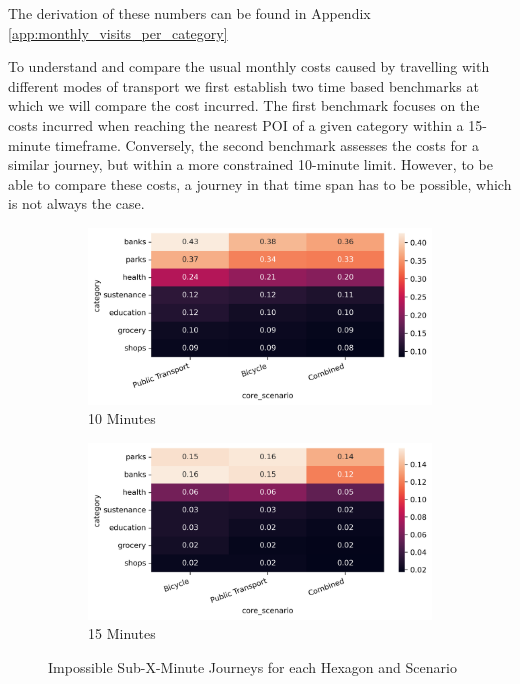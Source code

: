 The derivation of these numbers can be found in Appendix \ref{app:monthly_visits_per_category}

To understand and compare the usual monthly costs caused by travelling with different modes of transport we first establish two time based benchmarks at which we will compare the cost incurred.
The first benchmark focuses on the costs incurred when reaching the nearest POI of a given category within a 15-minute timeframe. 
Conversely, the second benchmark assesses the costs for a similar journey, but within a more constrained 10-minute limit.
However, to be able to compare these costs, a journey in that time span has to be possible, which is not always the case.


\begin{figure}
  \centering
  \begin{subfigure}[b]{0.45\textwidth}
    \centering
    \includegraphics[width=\textwidth]{Figures/results/monthly_costs/percentage_inf_10.png}
    \caption{10 Minutes}
    \label{fig:percentage_inf_10}
  \end{subfigure}
  \hfill
  \begin{subfigure}[b]{0.45\textwidth}
    \centering
    \includegraphics[width=\textwidth]{Figures/results/monthly_costs/percentage_inf_15.png}
    \caption{15 Minutes}
    \label{fig:percentage_inf_15}
  \end{subfigure}
  \caption{Impossible Sub-X-Minute Journeys for each Hexagon and Scenario}
  \label{fig:percentage_inf_x}
\end{figure}

